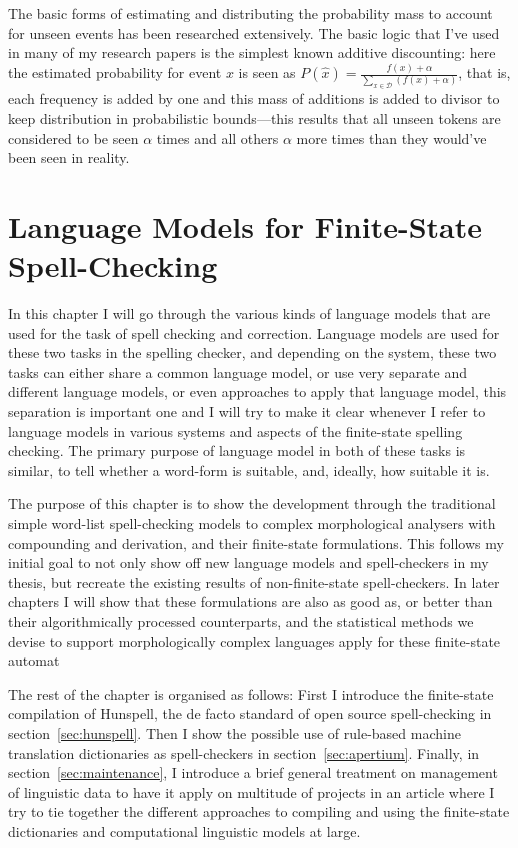 \documentclass[officiallayout]{unihelcompling}
\begin{document}
The basic forms of estimating and distributing the probability mass to account
for unseen events has been researched extensively. The basic logic that I've
used in many of my research papers is the simplest known additive discounting:
here the estimated probability for event $x$ is seen as 
$P(\hat{x}) = \frac{f(x) + \alpha}{\sum_{x \in \mathcal{D}}(f(x) + \alpha)}$,
that is, each frequency is added by one and this mass of additions is added to
divisor to keep distribution in probabilistic bounds---this results that all
unseen tokens are considered to be seen $\alpha$ times and all others $\alpha$
more times than they would've been seen in reality. 



\chapter{Language Models for Finite-State Spell-Checking}
\label{chap:language-models}

In this chapter I will go through the various kinds of language models that are
used for the task of spell checking and correction. Language models are used
for these two tasks in the spelling checker, and depending on the system,
these two tasks can either share a common language model, or use very
separate and different language models, or even approaches to apply that
language model, this separation is important one and I will try to make it
clear whenever I refer to language models in various systems and aspects of
the finite-state spelling checking. The primary purpose of language model in
both of these tasks is similar, to tell whether a word-form is suitable, and,
ideally, how suitable it is.

The purpose of this chapter is to show the development through the traditional
simple word-list spell-checking models to complex morphological analysers with
compounding and derivation, and their finite-state formulations. This follows
my initial goal to not only show off new language models and spell-checkers
in my thesis, but recreate the existing results of non-finite-state 
spell-checkers. In later chapters I will show that these formulations are
also as good as, or better than their algorithmically processed counterparts,
and the statistical methods we devise to support morphologically complex
languages apply for these finite-state automat 

The rest of the chapter is organised as follows: First I introduce the
finite-state compilation of Hunspell, the de facto standard of open source
spell-checking in section~\ref{sec:hunspell}.  Then I show the possible use of
rule-based machine translation dictionaries as spell-checkers in
section~\ref{sec:apertium}.  Finally, in section~\ref{sec:maintenance}, I
introduce a brief general treatment on management of linguistic data to have it
apply on multitude of projects in an article where I try to tie together the
different approaches to compiling and using the finite-state dictionaries and
computational linguistic models at large.
\end{document}
